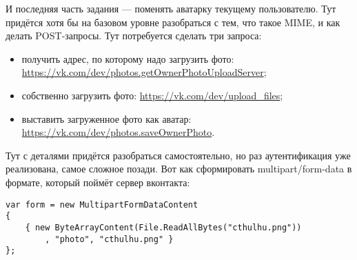 \documentclass{../../text-style}
\begin{document}
И последняя часть задания --- поменять аватарку текущему пользователю. Тут придётся хотя бы на базовом уровне разобраться с тем, что такое MIME, и как делать POST-запросы. Тут потребуется сделать три запроса:

\begin{itemize}
    \item получить адрес, по которому надо загрузить фото: \url{https://vk.com/dev/photos.getOwnerPhotoUploadServer};
    \item собственно загрузить фото: \url{https://vk.com/dev/upload_files};
    \item выставить загруженное фото как аватар: \url{https://vk.com/dev/photos.saveOwnerPhoto}.
\end{itemize}

Тут с деталями придётся разобраться самостоятельно, но раз аутентификация уже реализована, самое сложное позади. Вот как сформировать multipart/form-data в формате, который поймёт сервер вконтакта:

\begin{verbatim}
var form = new MultipartFormDataContent
{
    { new ByteArrayContent(File.ReadAllBytes("cthulhu.png"))
        , "photo", "cthulhu.png" }
};
\end{verbatim}
\end{document}

